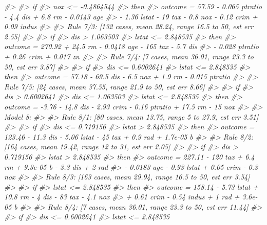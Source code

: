 \documentclass[]{book}
\newenvironment{Shaded}{\begin{snugshade}}{\end{snugshade}}
\newcommand{\CommentTok}[1]{\textcolor[rgb]{0.56,0.35,0.01}{\textit{#1}}}
\begin{document}
\begin{Shaded}
\begin{Highlighting}[]
\CommentTok{#> }
\CommentTok{#>     if}
\CommentTok{#>  nox <= -0.4864544}
\CommentTok{#>     then}
\CommentTok{#>  outcome = 57.59 - 0.065 ptratio - 4.4 dis + 6.8 rm - 0.0143 age}
\CommentTok{#>            - 1.36 lstat - 19 tax - 0.8 nox - 0.12 crim + 0.09 indus}
\CommentTok{#> }
\CommentTok{#>   Rule 7/3: [132 cases, mean 28.24, range 16.5 to 50, est err 2.55]}
\CommentTok{#> }
\CommentTok{#>     if}
\CommentTok{#>  dis > 1.063503}
\CommentTok{#>  lstat <= 2.848535}
\CommentTok{#>     then}
\CommentTok{#>  outcome = 270.92 + 24.5 rm - 0.0418 age - 165 tax - 5.7 dis}
\CommentTok{#>            - 0.028 ptratio + 0.26 crim + 0.017 zn}
\CommentTok{#> }
\CommentTok{#>   Rule 7/4: [7 cases, mean 36.01, range 23.3 to 50, est err 3.87]}
\CommentTok{#> }
\CommentTok{#>     if}
\CommentTok{#>  dis <= 0.6002641}
\CommentTok{#>  lstat <= 2.848535}
\CommentTok{#>     then}
\CommentTok{#>  outcome = 57.18 - 69.5 dis - 6.5 nox + 1.9 rm - 0.015 ptratio}
\CommentTok{#> }
\CommentTok{#>   Rule 7/5: [24 cases, mean 37.55, range 21.9 to 50, est err 8.66]}
\CommentTok{#> }
\CommentTok{#>     if}
\CommentTok{#>  dis > 0.6002641}
\CommentTok{#>  dis <= 1.063503}
\CommentTok{#>  lstat <= 2.848535}
\CommentTok{#>     then}
\CommentTok{#>  outcome = -3.76 - 14.8 dis - 2.93 crim - 0.16 ptratio + 17.5 rm - 15 nox}
\CommentTok{#> }
\CommentTok{#> Model 8:}
\CommentTok{#> }
\CommentTok{#>   Rule 8/1: [80 cases, mean 13.75, range 5 to 27.9, est err 3.51]}
\CommentTok{#> }
\CommentTok{#>     if}
\CommentTok{#>  dis <= 0.719156}
\CommentTok{#>  lstat > 2.848535}
\CommentTok{#>     then}
\CommentTok{#>  outcome = 123.46 - 11.3 dis - 5.06 lstat - 45 tax + 0.9 rad + 1.7e-05 b}
\CommentTok{#> }
\CommentTok{#>   Rule 8/2: [164 cases, mean 19.42, range 12 to 31, est err 2.05]}
\CommentTok{#> }
\CommentTok{#>     if}
\CommentTok{#>  dis > 0.719156}
\CommentTok{#>  lstat > 2.848535}
\CommentTok{#>     then}
\CommentTok{#>  outcome = 227.11 - 120 tax + 6.4 rm + 9.3e-05 b - 3.3 dis + 2 rad}
\CommentTok{#>            - 0.0183 age - 0.93 lstat + 0.05 crim - 0.3 nox}
\CommentTok{#> }
\CommentTok{#>   Rule 8/3: [163 cases, mean 29.94, range 16.5 to 50, est err 3.54]}
\CommentTok{#> }
\CommentTok{#>     if}
\CommentTok{#>  lstat <= 2.848535}
\CommentTok{#>     then}
\CommentTok{#>  outcome = 158.14 - 5.73 lstat + 10.8 rm - 4 dis - 83 tax - 4.1 nox}
\CommentTok{#>            + 0.61 crim - 0.54 indus + 1 rad + 3.6e-05 b}
\CommentTok{#> }
\CommentTok{#>   Rule 8/4: [7 cases, mean 36.01, range 23.3 to 50, est err 11.44]}
\CommentTok{#> }
\CommentTok{#>     if}
\CommentTok{#>  dis <= 0.6002641}
\CommentTok{#>  lstat <= 2.848535}

\end{Highlighting}
\end{Shaded}
\end{document}
